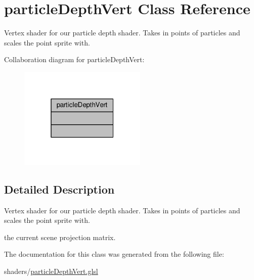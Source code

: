 \hypertarget{classparticle_depth_vert}{\section{particle\-Depth\-Vert Class Reference}
\label{classparticle_depth_vert}
}


Vertex shader for our particle depth shader. Takes in points of particles and scales the point sprite with.  




Collaboration diagram for particle\-Depth\-Vert\-:\nopagebreak
\begin{figure}[H]
\begin{center}
\leavevmode
\includegraphics[width=172pt]{classparticle_depth_vert__coll__graph}
\end{center}
\end{figure}


\subsection{Detailed Description}
Vertex shader for our particle depth shader. Takes in points of particles and scales the point sprite with. 

the current scene projection matrix. 

The documentation for this class was generated from the following file\-:\begin{DoxyCompactItemize}
\item 
shaders/\hyperlink{particle_depth_vert_8glsl}{particle\-Depth\-Vert.\-glsl}\end{DoxyCompactItemize}
